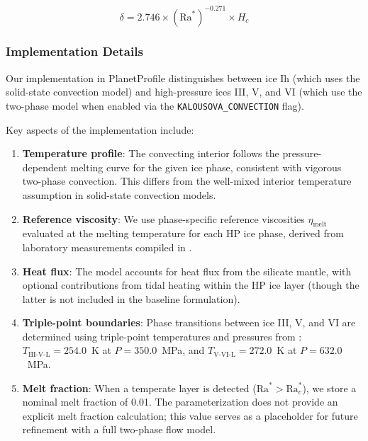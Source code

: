\begin{equation}
\delta = 2.746 \times (\text{Ra}^*)^{-0.271} \times H_c
\label{eq:delta}
\end{equation}

\subsubsection{Implementation Details}

Our implementation in PlanetProfile distinguishes between ice Ih (which uses the \citealt{deschamps2001thermal} solid-state convection model) and high-pressure ices III, V, and VI (which use the \citealt{kalousova2018melting} two-phase model when enabled via the \texttt{KALOUSOVA\_CONVECTION} flag).

Key aspects of the implementation include:

\begin{enumerate}
    \item \textbf{Temperature profile}: The convecting interior follows the pressure-dependent melting curve for the given ice phase, consistent with vigorous two-phase convection. This differs from the well-mixed interior temperature assumption in solid-state convection models.

    \item \textbf{Reference viscosity}: We use phase-specific reference viscosities $\eta_{\text{melt}}$ evaluated at the melting temperature for each HP ice phase, derived from laboratory measurements compiled in \citet{durham2010ice}.

    \item \textbf{Heat flux}: The model accounts for heat flux from the silicate mantle, with optional contributions from tidal heating within the HP ice layer (though the latter is not included in the baseline \citealt{kalousova2018melting} formulation).

    \item \textbf{Triple-point boundaries}: Phase transitions between ice III, V, and VI are determined using triple-point temperatures and pressures from \citet{journaux2020gibbs}: $T_{\text{III-V-L}} = 254.0$~K at $P = 350.0$~MPa, and $T_{\text{V-VI-L}} = 272.0$~K at $P = 632.0$~MPa.

    \item \textbf{Melt fraction}: When a temperate layer is detected ($\text{Ra}^* > \text{Ra}^*_c$), we store a nominal melt fraction of 0.01. The \citet{kalousova2018melting} parameterization does not provide an explicit melt fraction calculation; this value serves as a placeholder for future refinement with a full two-phase flow model.
\end{enumerate}

